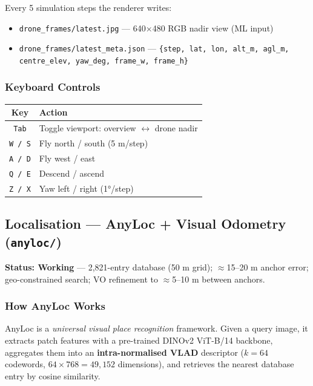 \documentclass[11pt,a4paper]{article}
\begin{document}
Every 5 simulation steps the renderer writes:
\begin{itemize}
  \item \texttt{drone\_frames/latest.jpg} --- 640×480 RGB nadir view (ML input)
  \item \texttt{drone\_frames/latest\_meta.json} --- \texttt{\{step, lat, lon, alt\_m, agl\_m, centre\_elev, yaw\_deg, frame\_w, frame\_h\}}
\end{itemize}

\subsubsection*{Keyboard Controls}

\begin{table}[h]
\centering
\begin{tabular}{@{}cl@{}}
\toprule
\textbf{Key} & \textbf{Action}\\
\midrule
\texttt{Tab} & Toggle viewport: overview $\leftrightarrow$ drone nadir\\
\texttt{W / S} & Fly north / south (5 m/step)\\
\texttt{A / D} & Fly west / east\\
\texttt{Q / E} & Descend / ascend\\
\texttt{Z / X} & Yaw left / right (1°/step)\\
\bottomrule
\end{tabular}
\end{table}

\subsection{Localisation --- AnyLoc + Visual Odometry (\texttt{anyloc/})}
\label{sec:anyloc}

\begin{donebox}
\textbf{Status: Working} --- 2,821-entry database (50 m grid); $\approx$15--20 m anchor error; geo-constrained search; VO refinement to $\approx$5--10 m between anchors.
\end{donebox}

\vspace{6pt}

\subsubsection*{How AnyLoc Works}

AnyLoc is a \textit{universal visual place recognition} framework.
Given a query image, it extracts patch features with a pre-trained DINOv2 ViT-B/14 backbone,
aggregates them into an \textbf{intra-normalised VLAD} descriptor ($k=64$ codewords,
$64 \times 768 = 49{,}152$ dimensions), and retrieves the nearest database entry by cosine similarity.
\end{document}
